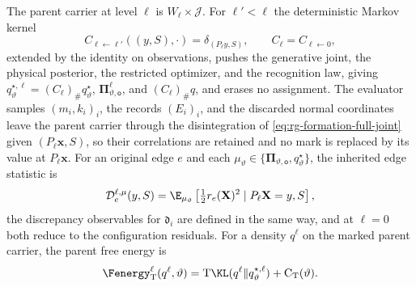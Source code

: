 The parent carrier at level \(\ell\) is \(W_\ell\times\mathcal J\). For
\(\ell'<\ell\) the deterministic Markov kernel
\begin{equation}
C_{\ell\leftarrow\ell'}((y,S),\cdot)=\delta_{(P_\ell y,S)},
\qquad C_\ell=C_{\ell\leftarrow0},
\label{eq:rg-formation-marked-channel}
\end{equation}
extended by the identity on observations, pushes the generative joint, the
physical posterior, the restricted optimizer, and the recognition law, giving
\(q^{\star,\ell}_\vartheta=(C_\ell)_\#q^\star_\vartheta\),
\(\boldsymbol\Pi^\ell_{\vartheta,\mathsf o}\), and \((C_\ell)_\#q\), and
erases no assignment. The evaluator samples \((m_i,k_i)_i\), the records
\((E_i)_i\), and the discarded normal coordinates leave the parent carrier
through the disintegration of \cref{eq:rg-formation-full-joint} given
\((P_\ell\mathbf x,S)\), so their correlations are retained and no mark is
replaced by its value at \(P_\ell\mathbf x\). For an original edge
\(e\) and each \(\mu_\vartheta\in
\{\boldsymbol\Pi_{\vartheta,\mathsf o},q^\star_\vartheta\}\), the inherited
edge statistic is
\begin{equation}
\mathcal D_e^{\ell,\mu}(y,S)
=\E_{\mu_\vartheta}
 \left[\tfrac12r_e(\mathbf X)^2\mid P_\ell\mathbf X=y,S\right],
\label{eq:rg-formation-inherited-edge-statistic}
\end{equation}
the discrepancy observables for \(\mathfrak d_i\) are defined in the same way,
and at \(\ell=0\) both reduce to the configuration residuals. For a density
\(q^\ell\) on the marked parent carrier, the parent free energy is
\begin{equation}
\Fenergy^\ell_{\mathrm T}(q^\ell,\vartheta)
  =\mathrm T\KL(q^\ell\Vert q^{\star,\ell}_\vartheta)+\mathrm C_{\mathrm T}(\vartheta).
\label{eq:rg-formation-parent-vfe}
\end{equation}

